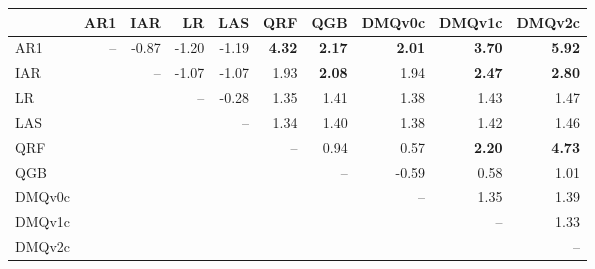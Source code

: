 \begin{tabular}{lrrrrrrrrr}
\toprule
 & AR1 & IAR & LR & LAS & QRF & QGB & DMQv0c & DMQv1c & DMQv2c \\
\midrule
AR1 & -- & -0.87 & -1.20 & -1.19 & \textbf{4.32} & \textbf{2.17} & \textbf{2.01} & \textbf{3.70} & \textbf{5.92} \\
IAR &  & -- & -1.07 & -1.07 & 1.93 & \textbf{2.08} & 1.94 & \textbf{2.47} & \textbf{2.80} \\
LR &  &  & -- & -0.28 & 1.35 & 1.41 & 1.38 & 1.43 & 1.47 \\
LAS &  &  &  & -- & 1.34 & 1.40 & 1.38 & 1.42 & 1.46 \\
QRF &  &  &  &  & -- & 0.94 & 0.57 & \textbf{2.20} & \textbf{4.73} \\
QGB &  &  &  &  &  & -- & -0.59 & 0.58 & 1.01 \\
DMQv0c &  &  &  &  &  &  & -- & 1.35 & 1.39 \\
DMQv1c &  &  &  &  &  &  &  & -- & 1.33 \\
DMQv2c &  &  &  &  &  &  &  &  & -- \\
\bottomrule
\end{tabular}
